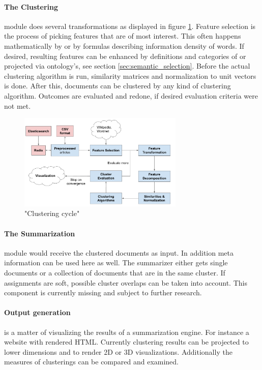   \paragraph{The Clustering} module does several transformations as displayed in figure \ref{clustering_cycle}. Feature selection is the process of picking features that are of most interest. This often happens mathematically by \tfidf{} or by formulas describing information density of words. If desired, resulting features can be enhanced by definitions and categories of \wiki{} or projected via \wordnet{} ontology's, see section \ref{sec:semantic_selection}. Before the actual clustering algorithm is run, similarity matrices and normalization to unit vectors is done. After this, documents can be clustered by any kind of clustering algorithm. Outcomes are evaluated and redone, if desired evaluation criteria were not met.

  \newpage
    \begin{figure}[h!]
      \centering
        \includegraphics[width=0.7\textwidth]{clustering_cycle.png}
        \caption{"Clustering cycle"}
        \label{clustering_cycle}
    \end{figure} 

  \paragraph{The Summarization} module would receive the clustered documents as input. In addition meta information can be used here as well. The summarizer either gets single documents or a collection of documents that are in the same cluster. If assignments are soft, possible cluster overlaps can be taken into account. This component is currently missing and subject to further research.

  \paragraph{Output generation} is a matter of visualizing the results of a summarization engine. For instance a website with rendered HTML. Currently clustering results can be projected to lower dimensions and to render 2D or 3D visualizations. Additionally the measures of clusterings can be compared and examined.


